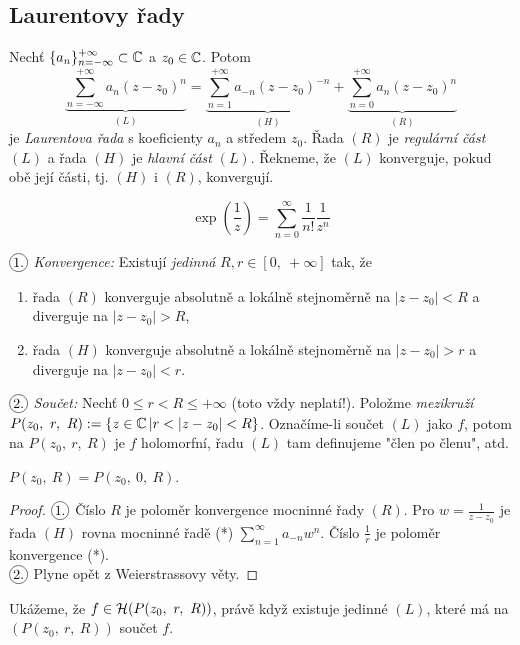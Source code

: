 \subsection{Laurentovy řady}
\begin{definition}
Nechť $\{a_n\}_{n=-\infty}^{+\infty}\subset\operatorname{\mathbb{C}}$ a $z_0\in\operatorname{\mathbb{C}}$. Potom 
\begin{equation}
    \underbrace{\sum_{n=-\infty}^{+\infty}a_n(z-z_0)^n}_{(L)}= \underbrace{\sum_{n=1}^{+\infty}a_{-n}(z-z_0)^{-n}}_{(H)} + \underbrace{\sum_{n=0}^{+\infty}a_n(z-z_0)^n}_{(R)}
\end{equation}
je \emph{Laurentova řada} s koeficienty ${a_n}$ a středem $z_0$. Řada $(R)$ je \emph{regulární část} $(L)$ a řada $(H)$ je \emph{hlavní část} $(L)$. Řekneme, že $(L)$ konverguje, pokud obě její části, tj. $(H)$ i $(R)$, konvergují.
\end{definition}

\begin{example}
$$\exp(\frac{1}{z})=\sum_{n=0}^\infty\frac{1}{n!}\frac{1}{z^n}$$
\end{example}
\begin{properties}[L]
$\circled{1.}$ \emph{Konvergence:} Existují \emph{jedinná} $R,r\in[0,\ +\infty]$ tak, že 
\begin{enumerate}
    \item
        řada $(R)$ konverguje absolutně a lokálně stejnoměrně na $|z-z_0|<R$ a diverguje na $|z-z_0|>R$, 
    \item
        řada $(H)$ konverguje absolutně a lokálně stejnoměrně na $|z-z_0|>r$ a diverguje na $|z-z_0|<r$.
\end{enumerate}

$\circled{2.}$ \emph{Součet:} Nechť $0\leq r<R\leq+\infty$ (toto vždy neplatí!). Položme \emph{mezikruží} $P(z_0,\ r,\ R) :=\{z\in\Comp|r<|z-z_0|<R\}$. Označíme-li součet $(L)$ jako $f$, potom na $P(z_0,\ r,\ R)$ je $f$ holomorfní, řadu $(L)$ tam definujeme "člen po členu", atd.
\end{properties}

\begin{note*}
$P(z_0,\ R)=P(z_0,\ 0,\ R)$.
\end{note*}

\begin{proof}
$\circled{1.}$ Číslo $R$ je poloměr konvergence mocninné řady $(R)$. Pro $w=\frac{1}{z-z_0}$ je řada $(H)$ rovna mocninné řadě (*) $\sum_{n=1}^\infty a_{-n}w^n$. Číslo $\frac{1}{r}$ je poloměr konvergence (*).\\
$\circled{2.}$ Plyne opět z Weierstrassovy věty.
\end{proof}

 Ukážeme, že $f\in\Holo(P(z_0,\ r,\ R))$, právě když existuje jedinné $(L)$, které má na $(P(z_0,\ r,\ R))$ součet $f$.
